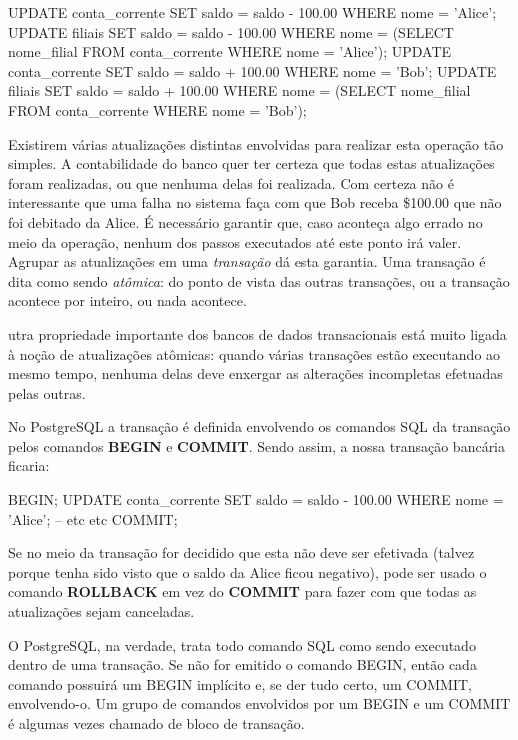 \begin{BoxVerbatim}
UPDATE conta_corrente SET saldo = saldo - 100.00
    WHERE nome = 'Alice';
UPDATE filiais SET saldo = saldo - 100.00
    WHERE nome = (SELECT nome_filial FROM conta_corrente WHERE nome = 'Alice');
UPDATE conta_corrente SET saldo = saldo + 100.00
    WHERE nome = 'Bob';
UPDATE filiais SET saldo = saldo + 100.00
    WHERE nome = (SELECT nome_filial FROM conta_corrente WHERE nome = 'Bob');
\end{BoxVerbatim}

Existirem várias atualizações distintas envolvidas para realizar esta operação tão simples. A contabilidade do banco 
quer ter certeza que todas estas atualizações foram realizadas, ou que nenhuma delas foi realizada.
Com certeza não é interessante que uma falha no sistema faça com que Bob receba \$100.00 que não foi debitado da Alice. 
É necessário garantir que, caso aconteça algo errado no meio da operação, nenhum dos passos executados até este ponto irá valer.
Agrupar as atualizações em uma {\it transação} dá esta garantia. Uma transação é dita como sendo {\it atômica}:
do ponto de vista das outras transações, ou a transação acontece por inteiro, ou nada acontece.

utra propriedade importante dos bancos de dados transacionais está muito ligada à noção de atualizações atômicas: 
quando várias transações estão executando ao mesmo tempo, nenhuma delas deve enxergar as alterações incompletas efetuadas pelas outras.


No PostgreSQL a transação é definida envolvendo os comandos SQL da transação pelos comandos {\bf BEGIN} e {\bf COMMIT}. Sendo assim, a nossa transação bancária ficaria:
\begin{BoxVerbatim}
BEGIN;
UPDATE conta_corrente SET saldo = saldo - 100.00
    WHERE nome = 'Alice';
    -- etc etc
COMMIT;
\end{BoxVerbatim}

Se no meio da transação for decidido que esta não deve ser efetivada (talvez porque tenha sido visto que o saldo da Alice ficou negativo),
pode ser usado o comando {\bf ROLLBACK} em vez do {\bf COMMIT} para fazer com que todas as atualizações sejam canceladas.

O PostgreSQL, na verdade, trata todo comando SQL como sendo executado dentro de uma transação. Se não for emitido o comando BEGIN, então cada comando possuirá um BEGIN implícito e, se der tudo certo, um COMMIT, envolvendo-o. Um grupo de comandos envolvidos por um BEGIN e um COMMIT é algumas vezes chamado de bloco de transação.


